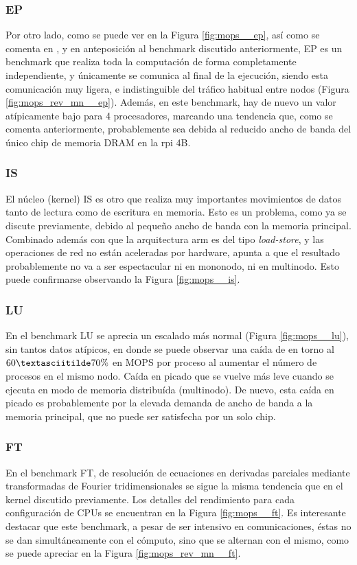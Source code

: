 \subsubsection{EP}
\label{sssec:resultados__ep}
Por otro lado, como se puede ver en la Figura \ref{fig:mops__ep}, así como se comenta en , y en anteposición al benchmark discutido anteriormente, EP es un benchmark que realiza toda la computación de forma completamente independiente, y únicamente se comunica al final de la ejecución, siendo esta comunicación muy ligera, e indistinguible del tráfico habitual entre nodos (Figura \ref{fig:mops_rev_mn__ep}). Además, en este benchmark, hay de nuevo un valor atípicamente bajo para 4 procesadores, marcando una tendencia que, como se comenta anteriormente, probablemente sea debida al reducido ancho de banda del único chip de memoria DRAM en la \acrlong{rpi} 4B.

\subsubsection{IS}
\label{sssec:resultados__is}
El núcleo (kernel) IS es otro que realiza muy importantes movimientos de datos tanto de lectura como de escritura en memoria. Esto es un problema, como ya se discute previamente, debido al pequeño ancho de banda con la memoria principal. Combinado además con que la arquitectura \acrshort{arm} es del tipo \textit{load-store}, y las operaciones de red no están aceleradas por hardware, apunta a que el resultado probablemente no va a ser espectacular ni en mononodo, ni en multinodo. Esto puede confirmarse observando la Figura \ref{fig:mops__is}.

\subsubsection{LU}
\label{sssec:resultados__lu}
En el benchmark LU se aprecia un escalado más normal (Figura \ref{fig:mops__lu}), sin tantos datos atípicos, en donde se puede observar una caída de en torno al $60\textasciitilde70\%$ en MOPS por proceso al aumentar el número de procesos en el mismo nodo. Caída en picado que se vuelve más leve cuando se ejecuta en modo de memoria distribuída (multinodo). De nuevo, esta caída en picado es probablemente por la elevada demanda de ancho de banda a la memoria principal, que no puede ser satisfecha por un solo chip.

\subsubsection{FT}
\label{sssec:resultados__ft}
En el benchmark FT, de resolución de ecuaciones en derivadas parciales mediante transformadas de Fourier tridimensionales se sigue la misma tendencia que en el kernel discutido previamente. Los detalles del rendimiento para cada configuración de CPUs se encuentran en la Figura \ref{fig:mops__ft}. Es interesante destacar que este benchmark, a pesar de ser intensivo en comunicaciones, éstas no se dan simultáneamente con el cómputo, sino que se alternan con el mismo, como se puede apreciar en la Figura \ref{fig:mops_rev_mn__ft}.

